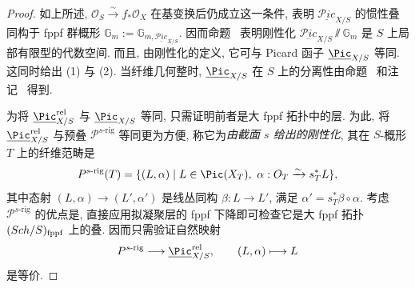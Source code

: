 \begin{proof}
如上所述, $\mathcal O_S\xrightarrow{\sim}f_*\mathcal O_X$ 在基变换后仍成立这一条件, 表明 $\underline{\mathcal P\!ic}_{X/S}$ 的惯性叠同构于 fppf 群概形 $\mathbb G_m:=\mathbb G_{m,\underline{\mathcal P\!ic}_{X/S}}$. 因而命题~ 表明刚性化 $\underline{\mathcal P\!ic}_{X/S}\!\sslash\mathbb G_m$ 是 $S$ 上局部有限型的代数空间. 而且, 由刚性化的定义, 它可与 Picard 函子 $\underline{\Pic}_{X/S}$ 等同. 这同时给出 (1) 与 (2). 当纤维几何整时, $\underline{\Pic}_{X/S}$ 在 $S$ 上的分离性由命题~ 和注记~ 得到.

为将 $\underline{\Pic}_{X/S}^{\mathrm{rel}}$ 与 $\underline{\Pic}_{X/S}$ 等同, 只需证明前者是大 fppf 拓扑中的层. 为此, 将 $\underline{\Pic}_{X/S}^{\mathrm{rel}}$ 与预叠 $\mathcal P^{s\text{-rig}}$ 等同更为方便, 称它为\emph{由截面 $s$ 给出的刚性化}, 其在 $S$-概形 $T$ 上的纤维范畴是
\[
\mathcal P^{s\text{-rig}}(T)=\{(L,\alpha)\mid L\in\Pic(X_T),\ \alpha:\mathcal O_T\xrightarrow{\sim}s_T^*L\},
\]
其中态射 $(L,\alpha)\to(L',\alpha')$ 是线丛同构 $\beta:L\to L'$, 满足 $\alpha'=s_T^*\beta\circ\alpha$. 考虑 $\mathcal P^{s\text{-rig}}$ 的优点是, 直接应用拟凝聚层的 fppf 下降即可检查它是大 fppf 拓扑 $(Sch/S)_{\mathrm{fppf}}$ 上的叠. 因而只需验证自然映射
\begin{equation}\label{src:7.4.64}
\mathcal P^{s\text{-rig}}\longrightarrow\underline{\Pic}_{X/S}^{\mathrm{rel}},\qquad(L,\alpha)\longmapsto L
\end{equation}
是等价.


\end{proof}
